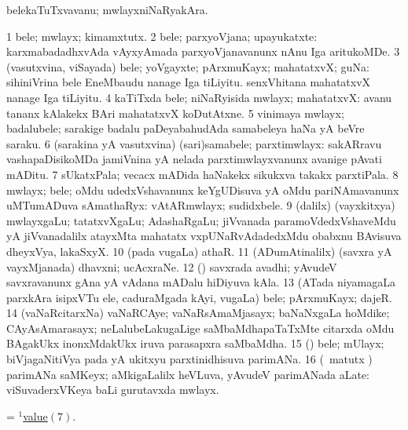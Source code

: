 \bentry
{} 
\gl{\nA}
\expl{}
\bmng
 belekaTuTxvavanu; mwlayxniNaRyakAra. 
\emng
\eentry

\bentry
{} 
\gl{\nA}
\expl{}
\bmng
\bnum
\num{1} bele; mwlayx; kimamxtutx. 
\num{2} bele; parxyoVjana; upayukatxte:  karxmabadadhxvAda vAyxyAmada parxyoVjanavanunx nAnu Iga aritukoMDe. 
\num{3} (vasutxvina, viSayada) bele; yoVgayxte; pArxmuKayx; mahatatxvX; guNa:  sihiniVrina bele EneMbaudu nanage Iga tiLiyitu.  senxVhitana mahatatxvX nanage Iga tiLiyitu. 
\num{4} kaTiTxda bele; niNaRyisida mwlayx; mahatatxvX:  avanu tananx kAlakekx BAri mahatatxvX koDutAtxne. 
\num{5} vinimaya mwlayx; badalubele; sarakige badalu paDeyabahudAda samabeleya haNa yA beVre saraku. 
\num{6} (sarakina yA vasutxvina) (sari)samabele; parxtimwlayx:  sakARravu vashapaDisikoMDa jamiVnina yA nelada parxtimwlayxvanunx avanige pAvati mADitu. 
\hypertarget{value(1)7}{} 
\num{7} sUkatxPala; vecacx mADida haNakekx sikukxva takakx parxtiPala. 
\num{8} mwlayx; bele; oMdu udedxVshavanunx keYgUDisuva yA oMdu pariNAmavanunx uMTumADuva sAmathaRyx:  vAtARmwlayx; sudidxbele. 
\num{9} (\bava dalilx) (vayxkitxya) mwlayxgaLu; tatatxvXgaLu; AdashaRgaLu; jiVvanada paramoVdedxVshaveMdu yA jiVvanadalilx atayxMta mahatatx vxpUNaRvAdadedxMdu obabxnu BAvisuva dheyxVya, lakaSxyX. 
\num{10} (pada \mo vugaLa) athaR. 
\num{11} (ADumAtinalilx) (savxra yA vayxMjanada) dhavxni; ucAcxraNe. 
\num{12} (\saM) savxrada avadhi; yAvudeV savxravanunx gAna yA vAdana mADalu hiDiyuva kAla. 
\num{13} (ATada niyamagaLa parxkAra isipxVTu ele, caduraMgada kAyi, \mo vugaLa) bele; pArxmuKayx; dajeR. 
\num{14} (vaNaRcitarxNa) vaNaRCAye; vaNaRsAmaMjasayx; baNaNxgaLa hoMdike; CAyAsAmarasayx; neLalubeLakugaLige saMbaMdhapaTaTxMte citarxda oMdu BAgakUkx inonxMdakUkx iruva parasapxra saMbaMdha. 
\num{15} (\ga) bele; mUlayx; biVjagaNitiVya pada yA ukitxyu parxtinidhisuva parimANa. 
\num{16} (\Bwvi\ matutx \ravi) parimANa saMKeyx; aMkigaLalilx heVLuva, yAvudeV parimANada aLate:  viSuvaderxVKeya baLi gurutavxda mwlayx. 
\enum
\emng

\noindent
\gl{\pagu}
\expl{}
\bmng
  = \hyperlink{value(1)7}{$^1$value\((7)\)}. 
\emng
\eentry

